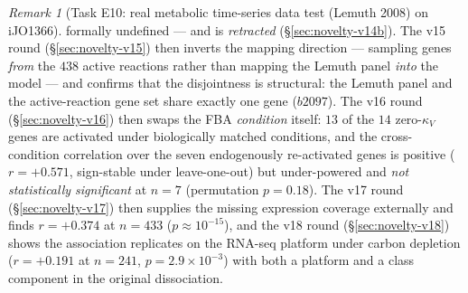\documentclass[11pt,a4paper]{article}
\theoremstyle{plain}
\theoremstyle{definition}
\theoremstyle{remark}
\newtheorem{remark}[theorem]{Remark}
\begin{document}
\begin{remark}[Task E10: real metabolic time-series data test
(Lemuth 2008) on iJO1366]
formally undefined --- and is \emph{retracted}
(\S\ref{sec:novelty-v14b}). The v15 round (\S\ref{sec:novelty-v15})
then inverts the mapping direction --- sampling genes \emph{from} the
$438$ active reactions rather than mapping the Lemuth panel
\emph{into} the model --- and confirms that the disjointness is
structural: the Lemuth panel and the active-reaction gene set share
exactly one gene ($b2097$). The v16 round (\S\ref{sec:novelty-v16})
then swaps the FBA \emph{condition} itself: $13$ of the $14$
zero-$\kappa_V$ genes are activated under biologically matched
conditions, and the cross-condition correlation over the seven
endogenously re-activated genes is positive ($r = +0.571$,
sign-stable under leave-one-out) but under-powered and
\emph{not statistically significant} at $n=7$ (permutation
$p = 0.18$). The v17 round (\S\ref{sec:novelty-v17}) then supplies
the missing expression coverage externally and finds
$r = +0.374$ at $n = 433$ ($p \approx 10^{-15}$), and the v18
round (\S\ref{sec:novelty-v18}) shows the association replicates on
the RNA-seq platform under carbon depletion ($r = +0.191$ at
$n = 241$, $p = 2.9 \times 10^{-3}$) with both a platform and a
class component in the original dissociation.
\end{remark}
\end{document}
